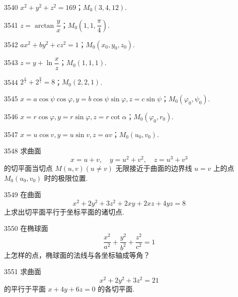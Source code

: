 \begin{prob}[S]{3540}
$x^2 + y^2 + z^2 = 169$；$M_0(3, 4, 12)$.
\end{prob}

\begin{prob}[S]{3541}
$z = \arctan\dfrac{y}{x}$；$M_0\left(1, 1, \dfrac{\pi}{4}\right)$.
\end{prob}

\begin{prob}[S]{3542}
$ax^2 + by^2 + cz^2 = 1$；$M_0(x_0, y_0, z_0)$.
\end{prob}

\begin{prob}[S]{3543}
$z = y + \ln\dfrac{x}{z}$；$M_0(1, 1, 1)$.
\end{prob}

\begin{prob}[S]{3544}
$2^{\frac{x}{z}} + 2^{\frac{y}{z}} = 8$；$M_0(2, 2, 1)$.
\end{prob}

\begin{prob}[S]{3545}
$x = a\cos\psi\cos\varphi, y = b\cos\psi\sin\varphi, z = c\sin\psi$；$M_0(\varphi_0, \psi_0)$.
\end{prob}

\begin{prob}[S]{3546}
$x = r\cos\varphi, y = r\sin\varphi, z = r\cot\alpha$；$M_0(\varphi_0, r_0)$.
\end{prob}

\begin{prob}[S]{3547}
$x = u\cos v, y = u\sin v, z = av$；$M_0(u_0, v_0)$.
\end{prob}

\begin{prob}[M]{3548}
求曲面
\[
x = u + v, \quad y = u^2 + v^2, \quad z = u^3 + v^3
\]
的切平面当切点 $M(u, v) (u \neq v)$ 无限接近于曲面的边界线 $u = v$ 上的点 $M_0(u_0, v_0)$ 时的极限位置.
\end{prob}

\begin{prob}[M]{3549}
在曲面
\[
x^2 + 2y^2 + 3z^2 + 2xy + 2xz + 4yz = 8
\]
上求出切平面平行于坐标平面的诸切点.
\end{prob}

\begin{prob}[M]{3550}
在椭球面
\[
\frac{x^2}{a^2} + \frac{y^2}{b^2} + \frac{z^2}{c^2} = 1
\]
上怎样的点，椭球面的法线与各坐标轴成等角？
\end{prob}

\begin{prob}[M]{3551}
求曲面
\[
x^2 + 2y^2 + 3z^2 = 21
\]
的平行于平面 $x + 4y + 6z = 0$ 的各切平面.
\end{prob}

